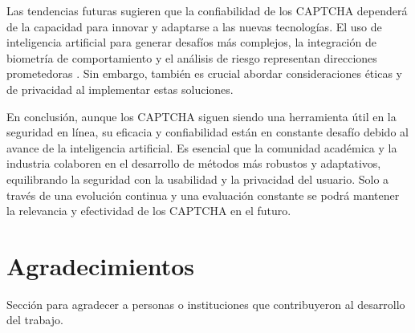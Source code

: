 \documentclass[conference]{IEEEtran}
\begin{document}
Las tendencias futuras sugieren que la confiabilidad de los CAPTCHA dependerá de la capacidad para innovar y adaptarse a las nuevas tecnologías. El uso de inteligencia artificial para generar desafíos más complejos, la integración de biometría de comportamiento y el análisis de riesgo representan direcciones prometedoras \cite{Sajjad2019, Murdoch2020}. Sin embargo, también es crucial abordar consideraciones éticas y de privacidad al implementar estas soluciones.

En conclusión, aunque los CAPTCHA siguen siendo una herramienta útil en la seguridad en línea, su eficacia y confiabilidad están en constante desafío debido al avance de la inteligencia artificial. Es esencial que la comunidad académica y la industria colaboren en el desarrollo de métodos más robustos y adaptativos, equilibrando la seguridad con la usabilidad y la privacidad del usuario. Solo a través de una evolución continua y una evaluación constante se podrá mantener la relevancia y efectividad de los CAPTCHA en el futuro.

\bigskip

\section*{Agradecimientos}
Sección para agradecer a personas o instituciones que contribuyeron al desarrollo del trabajo.

\bigskip



\end{document}
